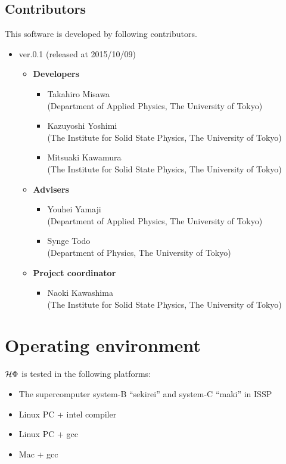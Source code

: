 \subsection{Contributors}
\label{subsec:contributors}
This software is developed by following contributors.
\begin{itemize}
\item{ver.0.1 (released at 2015/10/09)}
\begin{itemize}
	\item{\bf Developers}
	\begin{itemize}
	\item{Takahiro Misawa \\(Department of Applied Physics, The University of Tokyo)}
	\item{Kazuyoshi Yoshimi\\ (The Institute for Solid State Physics, The University of Tokyo)}
	\item{Mitsuaki Kawamura\\ (The Institute for Solid State Physics, The University of Tokyo)}
	\end{itemize}
	\item{\bf Advisers}
	\begin{itemize}
	\item{Youhei Yamaji\\ (Department of Applied Physics, The University of Tokyo)}
	\item{Synge Todo\\ (Department of Physics, The University of Tokyo)}
	\end{itemize}
	\item{\bf Project coordinator}
	\begin{itemize}
	\item{Naoki Kawashima\\ (The Institute for Solid State Physics, The University of Tokyo)}
	\end{itemize}
\end{itemize}
\end{itemize}

\section{Operating environment}
 $\mathcal{H} \Phi$ is tested in the following platforms:

\begin{itemize}
\item The supercomputer system-B ``sekirei'' and system-C ``maki'' in ISSP
\item Linux PC + intel compiler
\item Linux PC + gcc
\item Mac + gcc
\end{itemize}
